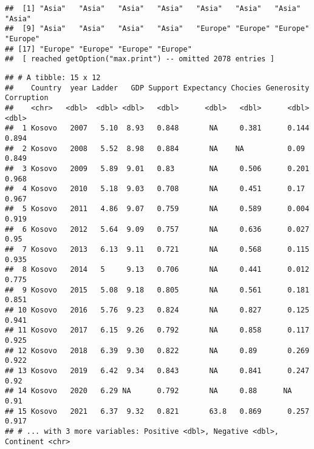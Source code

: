 \documentclass[
]{article}
\newenvironment{Shaded}{\begin{snugshade}}{\end{snugshade}}
\newcommand{\AttributeTok}[1]{\textcolor[rgb]{0.77,0.63,0.00}{#1}}
\newcommand{\CommentTok}[1]{\textcolor[rgb]{0.56,0.35,0.01}{\textit{#1}}}
\newcommand{\FunctionTok}[1]{\textcolor[rgb]{0.00,0.00,0.00}{#1}}
\newcommand{\NormalTok}[1]{#1}
\newcommand{\SpecialCharTok}[1]{\textcolor[rgb]{0.00,0.00,0.00}{#1}}
\newcommand{\StringTok}[1]{\textcolor[rgb]{0.31,0.60,0.02}{#1}}
\begin{document}
\begin{verbatim}
##  [1] "Asia"   "Asia"   "Asia"   "Asia"   "Asia"   "Asia"   "Asia"   "Asia"  
##  [9] "Asia"   "Asia"   "Asia"   "Asia"   "Europe" "Europe" "Europe" "Europe"
## [17] "Europe" "Europe" "Europe" "Europe"
##  [ reached getOption("max.print") -- omitted 2078 entries ]
\end{verbatim}

\begin{Shaded}
\end{Shaded}

\begin{verbatim}
## # A tibble: 15 x 12
##    Country  year Ladder   GDP Support Expectancy Chocies Generosity Corruption
##    <chr>   <dbl>  <dbl> <dbl>   <dbl>      <dbl>   <dbl>      <dbl>      <dbl>
##  1 Kosovo   2007   5.10  8.93   0.848       NA     0.381      0.144      0.894
##  2 Kosovo   2008   5.52  8.98   0.884       NA    NA          0.09       0.849
##  3 Kosovo   2009   5.89  9.01   0.83        NA     0.506      0.201      0.968
##  4 Kosovo   2010   5.18  9.03   0.708       NA     0.451      0.17       0.967
##  5 Kosovo   2011   4.86  9.07   0.759       NA     0.589      0.004      0.919
##  6 Kosovo   2012   5.64  9.09   0.757       NA     0.636      0.027      0.95 
##  7 Kosovo   2013   6.13  9.11   0.721       NA     0.568      0.115      0.935
##  8 Kosovo   2014   5     9.13   0.706       NA     0.441      0.012      0.775
##  9 Kosovo   2015   5.08  9.18   0.805       NA     0.561      0.181      0.851
## 10 Kosovo   2016   5.76  9.23   0.824       NA     0.827      0.125      0.941
## 11 Kosovo   2017   6.15  9.26   0.792       NA     0.858      0.117      0.925
## 12 Kosovo   2018   6.39  9.30   0.822       NA     0.89       0.269      0.922
## 13 Kosovo   2019   6.42  9.34   0.843       NA     0.841      0.247      0.92 
## 14 Kosovo   2020   6.29 NA      0.792       NA     0.88      NA          0.91 
## 15 Kosovo   2021   6.37  9.32   0.821       63.8   0.869      0.257      0.917
## # ... with 3 more variables: Positive <dbl>, Negative <dbl>, Continent <chr>
\end{verbatim}
\end{document}
